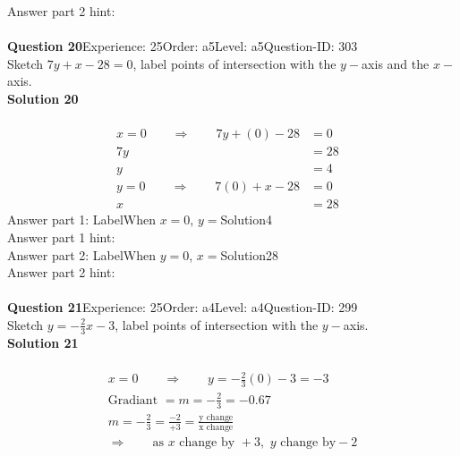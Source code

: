 \documentclass{article}
\begin{document}
Answer part 2 hint: \hspace{15pt}\\
\\[4pt]
\noindent\textbf{Question 20}\hspace{20pt}Experience: 25\hspace{20pt}Order: a5\hspace{20pt}Level: a5\hspace{20pt}Question-ID: 303\\[2pt]
Sketch $7y+x-28=0$, label points of intersection with the $y-$axis and the $x-$axis.\\[4pt]
\noindent\textbf{Solution 20}\\[2pt]
\\[-35pt]\begin{align*}
x=0\qquad\Rightarrow\qquad 7y+(0)-28&=0&\\[2pt]
7y&=28\\[2pt]
y&=4\\[12pt]
y=0\qquad\Rightarrow\qquad 7(0)+x-28&=0&\\[2pt]
x&=28
\end{align*}
Answer part 1: \hspace{10pt}Label\hspace{10pt}When $x=0$, $y=$\hspace{10pt}Solution\hspace{10pt}4\\
Answer part 1 hint: \hspace{15pt}\\
Answer part 2: \hspace{10pt}Label\hspace{10pt}When $y=0$, $x=$\hspace{10pt}Solution\hspace{10pt}28\\
Answer part 2 hint: \hspace{15pt}\\
\\[4pt]
\noindent\textbf{Question 21}\hspace{20pt}Experience: 25\hspace{20pt}Order: a4\hspace{20pt}Level: a4\hspace{20pt}Question-ID: 299\\[2pt]
Sketch $y=-\displaystyle\frac{2}{3}x-3$, label points of intersection with the $y-$axis.\\[4pt]
\noindent\textbf{Solution 21}\\[2pt]
\\[-35pt]\begin{align*}
&x=0\qquad\Rightarrow\qquad y=-\displaystyle\frac{2}{3}(0)-3=-3&\\[2pt]
&\text{Gradiant}\,\,=m=-\displaystyle\frac{2}{3}=-0.67&\\[2pt]
&m=-\displaystyle\frac{2}{3}=\displaystyle\frac{-2}{+3}=\displaystyle\frac{\text{y change}}{\text{x change}}&\\[2pt]
& \Rightarrow\qquad \text{as}\,\, x \,\,\text{change by } +3,\,\, y\,\, \text{change by} -2 &
\end{align*}
\end{document}
